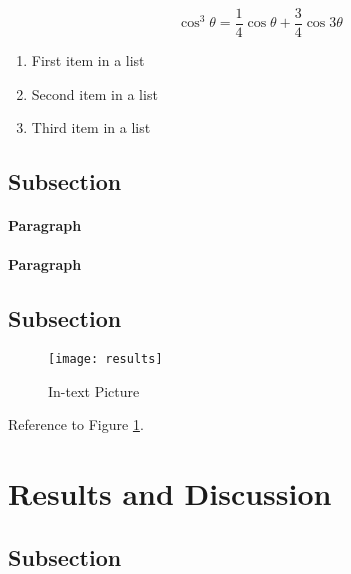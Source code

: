 \documentclass[fleqn,10pt]{SelfArx} %
\begin{document}
\lipsum[4] %

\begin{equation}
\cos^3 \theta =\frac{1}{4}\cos\theta+\frac{3}{4}\cos 3\theta
\label{eq:refname2}
\end{equation}

\lipsum[5] %

\begin{enumerate}[noitemsep] %
\item First item in a list
\item Second item in a list
\item Third item in a list
\end{enumerate}

\subsection{Subsection}

\lipsum[6] %

\paragraph{Paragraph} \lipsum[7] %
\paragraph{Paragraph} \lipsum[8] %

\subsection{Subsection}

\lipsum[9] %

\begin{figure}[ht]\centering
\texttt{[image: results]}
\caption{In-text Picture}
\label{fig:results}
\end{figure}

Reference to Figure \ref{fig:results}.


\section{Results and Discussion}

\lipsum[10] %

\subsection{Subsection}
\end{document}
